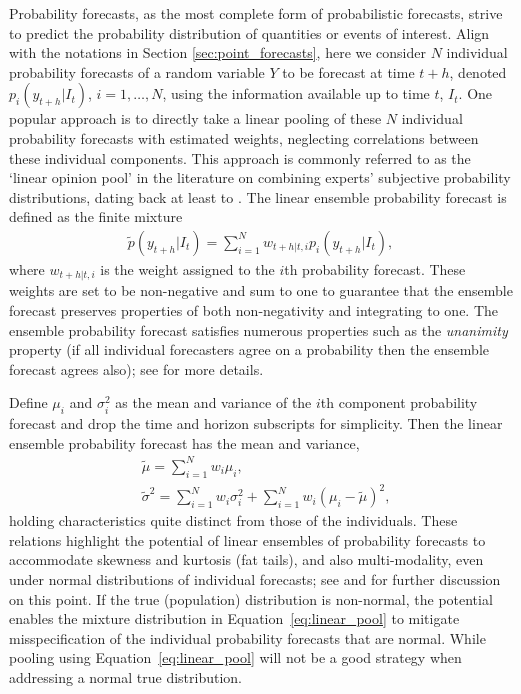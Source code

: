\documentclass[11pt]{article}
\begin{document}
Probability forecasts, as the most complete form of probabilistic forecasts, strive to predict the probability distribution of quantities or events of interest. Align with the notations in Section \ref{sec:point_forecasts}, here we consider $N$ individual probability forecasts of a random variable $Y$ to be forecast at time $t+h$, denoted $p_{i}(y_{t+h}|I_{t})$, $i=1,\ldots,N$, using the information available up to time $t$, $I_{t}$. One popular approach is to directly take a linear pooling of these $N$ individual probability forecasts with estimated weights, neglecting correlations between these individual components. This approach is commonly referred to as the `linear opinion pool' in the literature on combining experts' subjective probability distributions, dating back at least to \cite{Stone1961-zd}. The linear ensemble probability forecast is defined as the finite mixture
\begin{align}
\label{eq:linear_pool}
\tilde{p}(y_{t+h}|I_{t}) = \sum_{i=1}^{N} w_{t+h|t,i} p_{i}(y_{t+h}|I_{t}),
\end{align}
where $w_{t+h|t,i}$ is the weight assigned to the $i$th probability forecast. These weights are set to be non-negative and sum to one to guarantee that the ensemble forecast preserves properties of both non-negativity and integrating to one. The ensemble probability forecast satisfies numerous properties such as the \textit{unanimity} property (if all individual forecasters agree on a probability then the ensemble forecast agrees also); see \cite{Clemen1999-mh} for more details.

Define $\mu_{i}$ and $\sigma_{i}^{2}$ as the mean and variance of the $i$th component probability forecast and drop the time and horizon subscripts for simplicity. Then the linear ensemble probability forecast has the mean and variance,
\begin{align}
& \tilde{\mu} = \sum_{i=1}^{N} w_{i} \mu_{i}, \label{eq:mean_linear_pooling} \\
& \tilde{\sigma}^{2} = \sum_{i=1}^{N} w_{i} \sigma_{i}^{2} + \sum_{i=1}^{N} w_{i} \left(\mu_{i}-\tilde{\mu}\right)^{2}, \label{eq:variance_linear_pooling}
\end{align}
holding characteristics quite distinct from those of the individuals. These relations highlight the potential of linear ensembles of probability forecasts to accommodate skewness and kurtosis (fat tails), and also multi-modality, even under normal distributions of individual forecasts; see \cite{Wallis2005-yf} and \cite{Hall2007-lh} for further discussion on this point. If the true (population) distribution is non-normal, the potential enables the mixture distribution in Equation~\eqref{eq:linear_pool} to mitigate misspecification of the individual probability forecasts that are normal. While pooling using Equation~\eqref{eq:linear_pool} will not be a good strategy when addressing a normal true distribution.
\end{document}
